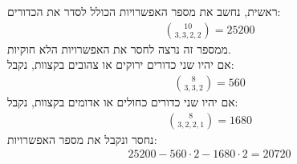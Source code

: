 \documentclass[a4paper, 12pt, leqno]{article}
\newcommand{\eq}[1]{\begin{align*}#1\end{align*}}
\begin{document}
\section{}
ראשית, נחשב את מספר האפשרויות הכולל לסדר את הכדורים:
\eq{
    \binom{10}{3,3,2,2}=25200
}
ממספר זה נרצה לחסר את האפשרויות הלא חוקיות.\\
אם יהיו שני כדורים ירוקים או צהובים בקצוות, נקבל:
\eq{
    \binom{8}{3,3,2}=560
}
אם יהיו שני כדורים כחולים או אדומים בקצוות, נקבל:
\eq{
    \binom{8}{3,2,2,1}=1680
}
נחסר ונקבל את מספר האפשרויות:
\eq{
    25200-560\cdot2-1680\cdot2=20720
}

\section{}

\end{document}
